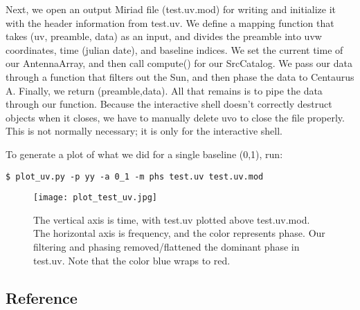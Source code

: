 Next, we open an output Miriad file (test.uv.mod) for writing and initialize it
with the header information from test.uv.  We define a mapping function that
takes (uv, preamble, data) as an input, and divides the preamble into uvw
coordinates, time (julian date), and baseline indices.  We set the current time
of our AntennaArray, and then call compute() for our SrcCatalog.  We pass our
data through a function that filters out the Sun, and then phase the data to
Centaurus A.  Finally, we return (preamble,data).  All that remains is to pipe
the data through our function.  Because the interactive shell doesn't correctly
destruct objects when it closes, we have to manually delete uvo to close the
file properly.  This is not normally necessary; it is only for the interactive
shell.

To generate a plot of what we did for a single baseline (0,1), run:
\begin{verbatim}
$ plot_uv.py -p yy -a 0_1 -m phs test.uv test.uv.mod
\end{verbatim}

\begin{figure}
\begin{center}
\texttt{[image: plot\_test\_uv.jpg]}
\caption{The vertical axis is time, with test.uv plotted above test.uv.mod.
The horizontal axis is frequency, and the color represents phase.  
Our filtering and phasing removed/flattened the dominant phase in test.uv.
Note that the color blue wraps to red.}
\end{center}
\end{figure}

\subsection{Reference}

